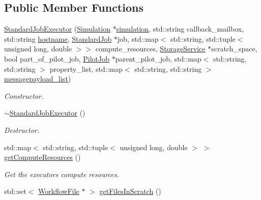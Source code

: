 \subsection*{Public Member Functions}
\begin{DoxyCompactItemize}
\item 
\hyperlink{classwrench_1_1_standard_job_executor_aed90b8b3216347ac11693ade98317eb7}{Standard\+Job\+Executor} (\hyperlink{classwrench_1_1_simulation}{Simulation} $\ast$\hyperlink{classwrench_1_1_s4_u___daemon_a305beca7ad2fb650ad1492b7c95e93c4}{simulation}, std\+::string callback\+\_\+mailbox, std\+::string \hyperlink{classwrench_1_1_s4_u___daemon_a52bc0b9a6cd248310749dac086819f00}{hostname}, \hyperlink{classwrench_1_1_standard_job}{Standard\+Job} $\ast$job, std\+::map$<$ std\+::string, std\+::tuple$<$ unsigned long, double $>$$>$ compute\+\_\+resources, \hyperlink{classwrench_1_1_storage_service}{Storage\+Service} $\ast$scratch\+\_\+space, bool part\+\_\+of\+\_\+pilot\+\_\+job, \hyperlink{classwrench_1_1_pilot_job}{Pilot\+Job} $\ast$parent\+\_\+pilot\+\_\+job, std\+::map$<$ std\+::string, std\+::string $>$ property\+\_\+list, std\+::map$<$ std\+::string, std\+::string $>$ \hyperlink{classwrench_1_1_service_a63865f20c92027ab626ab1347b0099d2}{messagepayload\+\_\+list})
\begin{DoxyCompactList}\small\item\em Constructor. \end{DoxyCompactList}\item 
\mbox{\label{classwrench_1_1_standard_job_executor_ad3846a691cac82efeaebde4dc7b89a2d}} 
\hyperlink{classwrench_1_1_standard_job_executor_ad3846a691cac82efeaebde4dc7b89a2d}{$\sim$\+Standard\+Job\+Executor} ()
\begin{DoxyCompactList}\small\item\em Destructor. \end{DoxyCompactList}\item 
std\+::map$<$ std\+::string, std\+::tuple$<$ unsigned long, double $>$ $>$ \hyperlink{classwrench_1_1_standard_job_executor_ae6ea189c8107ee3c8288185d8e6de8f7}{get\+Compute\+Resources} ()
\begin{DoxyCompactList}\small\item\em Get the executor\textquotesingle{}s compute resources. \end{DoxyCompactList}\item 
std\+::set$<$ \hyperlink{classwrench_1_1_workflow_file}{Workflow\+File} $\ast$ $>$ \hyperlink{classwrench_1_1_standard_job_executor_a655565a462444bbf5bd6f9fd426f273f}{get\+Files\+In\+Scratch} ()
$$
\end{DoxyCompactItemize}
